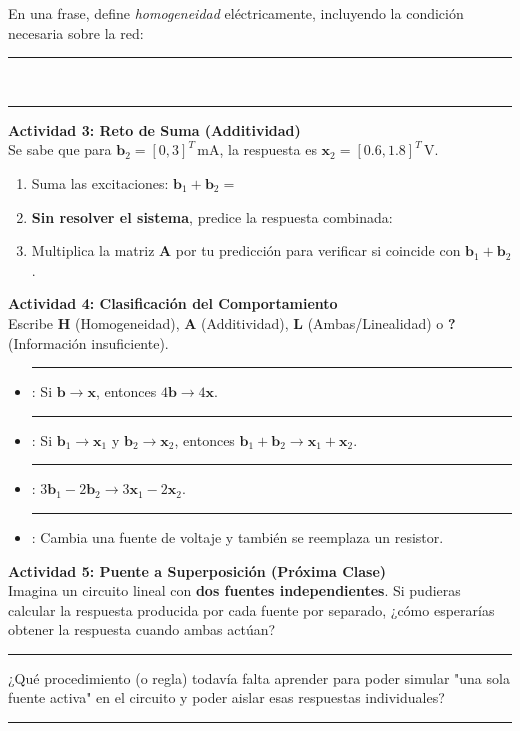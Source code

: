 \documentclass[11pt, a4paper]{article}
\begin{document}
\noindent En una frase, define \textit{homogeneidad} eléctricamente, incluyendo la condición necesaria sobre la red: \\
\rule{\textwidth}{0.4pt} \\ \rule{\textwidth}{0.4pt}

\vspace{0.4cm}
\noindent\textbf{Actividad 3: Reto de Suma (Additividad)} \\
Se sabe que para $\bm{b}_2 = [0, 3]^T\,\text{mA}$, la respuesta es $\bm{x}_2 = [0.6, 1.8]^T\,\text{V}$.
\begin{enumerate}
    \item Suma las excitaciones: $\bm{b}_1 + \bm{b}_2 = $ \hrulefill
    \item \textbf{Sin resolver el sistema}, predice la respuesta combinada: \hrulefill
    \item Multiplica la matriz $\bm{A}$ por tu predicción para verificar si coincide con $\bm{b}_1 + \bm{b}_2$.
\end{enumerate}

\vspace{0.4cm}
\noindent\textbf{Actividad 4: Clasificación del Comportamiento} \\
Escribe \textbf{H} (Homogeneidad), \textbf{A} (Additividad), \textbf{L} (Ambas/Linealidad) o \textbf{?} (Información insuficiente).
\begin{itemize}\setlength\itemsep{-0.1em}
    \item \rule{1cm}{0.4pt} : Si $\bm{b} \rightarrow \bm{x}$, entonces $4\bm{b} \rightarrow 4\bm{x}$.
    \item \rule{1cm}{0.4pt} : Si $\bm{b}_1 \rightarrow \bm{x}_1$ y $\bm{b}_2 \rightarrow \bm{x}_2$, entonces $\bm{b}_1+\bm{b}_2 \rightarrow \bm{x}_1+\bm{x}_2$.
    \item \rule{1cm}{0.4pt} : $3\bm{b}_1 - 2\bm{b}_2 \rightarrow 3\bm{x}_1 - 2\bm{x}_2$.
    \item \rule{1cm}{0.4pt} : Cambia una fuente de voltaje y también se reemplaza un resistor.
\end{itemize}

\vspace{0.4cm}
\noindent\textbf{Actividad 5: Puente a Superposición (Próxima Clase)} \\
Imagina un circuito lineal con \textbf{dos fuentes independientes}. Si pudieras calcular la respuesta producida por cada fuente por separado, ¿cómo esperarías obtener la respuesta cuando ambas actúan? \\
\rule{\textwidth}{0.4pt}

\noindent ¿Qué procedimiento (o regla) todavía falta aprender para poder simular "una sola fuente activa" en el circuito y poder aislar esas respuestas individuales? \\
\rule{\textwidth}{0.4pt}
\end{document}
